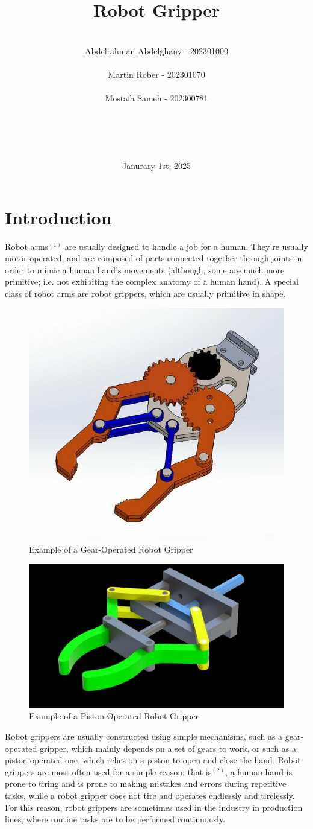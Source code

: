 \documentclass{article}
\title{Robot Gripper}
\author{ \\ Abdelrahman Abdelghany - 202301000 \\ \\ Martin Rober - 202301070 \\ \\ Mostafa Sameh - 202300781 \\ \\ \\ \\ \\  }
\date{Janurary 1st, 2025}
\begin{document}
\maketitle

\newpage
\section*{Introduction}
Robot arms$^{(1)}$ are usually designed to handle a job for a human. They're usually motor operated,
and are composed of parts connected together through joints in order to mimic a human hand's movements
(although, some are much more primitive; i.e. not exhibiting the complex anatomy of a human hand).
\newline \newline
A special class of robot arms are robot grippers, which are usually primitive in shape.
\begin{figure}[h]
    \centering
    \includegraphics[width=0.5\linewidth]{Images/gear-operated_robot_gripper.jpg}
    \caption{Example of a Gear-Operated Robot Gripper}
    \label{fig:f1}
\end{figure}
\begin{figure}[h]
    \centering
    \includegraphics[width=0.5\linewidth]{Images/piston-operated_robot_gripper.jpg}
    \caption{Example of a Piston-Operated Robot Gripper}
    \label{fig:f2}
\end{figure}
\newline
Robot grippers are usually constructed using simple mechanisms, such as a gear-operated gripper,
which mainly depends on a set of gears to work, or such as a piston-operated one, which relies
on a piston to open and close the hand.
\newline \newline
Robot grippers are most often used for a simple reason; that is$^{(2)}$, a human hand is prone to tiring
and is prone to making mistakes and errors during repetitive tasks, while a robot gripper does 
not tire and operates endlessly and tirelessly. For this reason, robot grippers are sometimes used
in the industry in production lines, where routine tasks are to be performed continuously.
\end{document}
